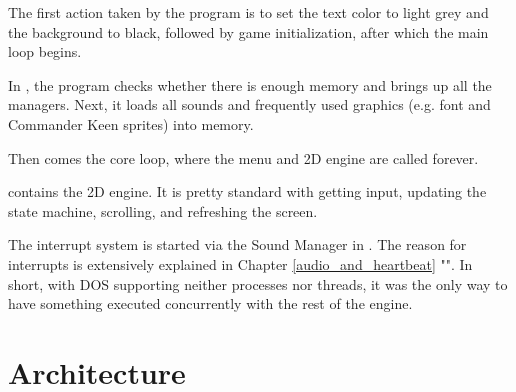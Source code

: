 \documentclass[book.tex]{subfiles}
\begin{document}
\par
The first action taken by the program is to set the text color to light grey and the background to black, followed by game initialization, after which the main loop begins. \\
\par
\begin{minipage}{\textwidth}

\end{minipage}
\par

\par
In , the program checks whether there is enough memory and brings up all the managers. Next, it loads all sounds and frequently used graphics (e.g. font and Commander Keen sprites) into memory.\\
\par
\begin{minipage}{\textwidth}

\end{minipage}
\par
Then comes the core loop, where the menu and 2D engine are called forever.\\

\begin{minipage}{\textwidth}

\end{minipage}
\par
{} contains the 2D engine. It is pretty standard with getting input, updating the state machine, scrolling, and refreshing the screen.\\

\par
\begin{minipage}{\textwidth}

\end{minipage} 
\par
 
The interrupt system is started via the Sound Manager in . The reason for interrupts is extensively explained in Chapter \ref{audio_and_heartbeat} "". In short, with DOS supporting neither processes nor threads, it was the only way to have something executed concurrently with the rest of the engine.


\section{Architecture}
\end{document}
